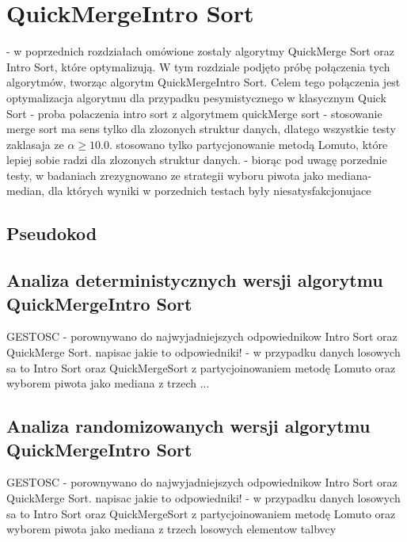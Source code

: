\newpage
\section{QuickMergeIntro Sort}
- w poprzednich rozdziałach omówione zostały algorytmy QuickMerge Sort oraz Intro Sort, które optymalizują.
W tym rozdziale podjęto próbę połączenia tych algorytmów, tworząc algorytm QuickMergeIntro Sort. Celem tego połączenia jest optymalizacja algorytmu dla przypadku pesymistycznego w klasycznym Quick Sort
- proba polaczenia intro sort z algorytmem quickMerge sort
- stosowanie merge sort ma sens tylko dla zlozonych struktur danych, dlatego wszystkie testy zaklasaja ze $\alpha \geq 10.0$. stosowano tylko partycjonowanie metodą Lomuto, które lepiej sobie radzi dla zlozonych struktur danych.
- biorąc pod uwagę porzednie testy, w badaniach zrezygnowano ze strategii wyboru piwota jako mediana-median, dla których wyniki w porzednich testach były niesatysfakcjonujace

\subsection{Pseudokod}



\subsection{Analiza deterministycznych wersji algorytmu QuickMergeIntro Sort}

GESTOSC
- porownywano do najwyjadniejszych odpowiednikow Intro Sort oraz QuickMerge Sort. napisac jakie to odpowiedniki!
- w przypadku danych losowych sa to Intro Sort oraz QuickMergeSort z partycjoinowaniem metodę Lomuto oraz wyborem piwota jako mediana z trzech ...

\begin{figure}[]
	\centering
	
	\caption[]{}
	\label{fig:quick-merge-intro-sort-deterministic-pivot-density}
\end{figure}

\subsection{Analiza randomizowanych wersji algorytmu QuickMergeIntro Sort}

GESTOSC
- porownywano do najwyjadniejszych odpowiednikow Intro Sort oraz QuickMerge Sort. napisac jakie to odpowiedniki!
- w przypadku danych losowych sa to Intro Sort oraz QuickMergeSort z partycjoinowaniem metodę Lomuto oraz wyborem piwota jako mediana z trzech losowych elementow talbvcy 

